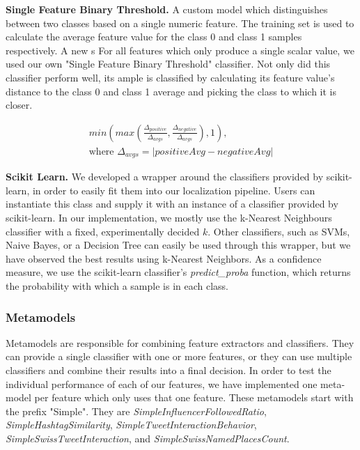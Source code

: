 \documentclass[10pt,a4paper]{article}
\begin{document}
\textbf{Single Feature Binary Threshold.} A custom model which distinguishes between two classes based on a single numeric feature. The training set is used to calculate the average feature value for the class 0 and class 1 samples respectively. A new s For all features which only produce a single scalar value, we used our own "Single Feature Binary Threshold" classifier. Not only did this classifier perform well, its ample is classified by calculating its feature value's distance to the class 0 and class 1 average and picking the class to which it is closer.

\begin{equation}
\begin{split}
min(max(\frac{\Delta_{positive}}{\Delta_{avgs}}, \frac{\Delta_{negative}}{\Delta_{avgs}}), 1), \\
\text{where } \Delta_{avgs} = |positiveAvg - negativeAvg|
\end{split}
\end{equation}

\textbf{Scikit Learn.} We developed a wrapper around the classifiers provided by scikit-learn, in order to easily fit them into our localization pipeline. Users can instantiate this class and supply it with an instance of a classifier provided by scikit-learn. In our implementation, we mostly use the k-Nearest Neighbours classifier with a fixed, experimentally decided $k$. Other classifiers, such as SVMs, Naive Bayes, or a Decision Tree can easily be used through this wrapper, but we have observed the best results using k-Nearest Neighbors. As a confidence measure, we use the scikit-learn classifier's \textit{predict\_proba} function, which returns the probability with which a sample is in each class.

\subsubsection{Metamodels}
Metamodels are responsible for combining feature extractors and classifiers. They can provide a single classifier with one or more features, or they can use multiple classifiers and combine their results into a final decision. In order to test the individual performance of each of our features, we have implemented one meta-model per feature which only uses that one feature. These metamodels start with the prefix "Simple". They are \textit{SimpleInfluencerFollowedRatio}, \textit{SimpleHashtagSimilarity}, \textit{SimpleTweetInteractionBehavior}, \textit{SimpleSwissTweetInteraction}, and \textit{SimpleSwissNamedPlacesCount}. 
\end{document}

